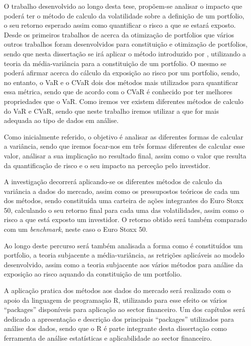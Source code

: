 \documentclass[
  12pt,
  a4paper,
  openany]{book}
\begin{document}
O trabalho desenvolvido ao longo desta tese, propõem-se analisar o impacto que poderá ter o método de calculo da volatilidade sobre a definição de um portfolio, o seu retorno esperado assim como quantificar o risco a que se estará exposto. Desde os primeiros trabalhos de \citet{Markowitz1952} acerca da otimização de portfolios que vários outros trabalhos foram desenvolvidos para constituição e otimização de portfolios, sendo que nesta dissertação se irá aplicar o método introduzido por \citet{Markowitz1952}, utilizando a teoria da média-variância para a constituição de um portfolio. O mesmo se poderá afirmar acerca do cálculo da exposição ao risco por um portfolio, sendo, no entanto, o VaR e o CVaR dois dos métodos mais utilizados para quantificar essa métrica, sendo que de acordo com \citet{OptVaR2000} o CVaR é conhecido por ter melhores propriedades que o VaR. Como iremos ver existem diferentes métodos de calculo do VaR e CVaR, sendo que neste trabalho iremos utilizar a que for mais adequada ao tipo de dados em análise.

Como inicialmente referido, o objetivo é analisar as diferentes formas de calcular a variância, sendo que iremos focar-nos em três formas diferentes de calcular esse valor, análisar a sua implicação no resultado final, assim como o valor que resulta da quantificação de risco e o seu impacto na perceção pelo investidor.

A investigação decorrerá aplicando-se os diferentes métodos de calculo da variância a dados do mercado, assim como os pressupostos teóricos de cada um dos métodos, sendo constituída uma carteira de ações integrantes do Euro Stoxx 50, calculando o seu retorno final para cada uma das volatilidades, assim como o risco a que está exposto um investidor. O retorno obtido será também comparado com um \emph{benchmark}, neste caso o Euro Stoxx 50.

Ao longo deste percurso será também analisada a forma como é constituídos um portfolio, a teoria subjacente a média-variância, as retrições aplicáveis ao modelo desenvolvido, assim como a teoria subjacente aos vários métodos para análise da exposição ao risco aquando da constituição de um portfolio.

A aplicação pratica dos métodos aos dados do mercado será realizado com o apoio da linguagem de programação R, utilizando para esse efeito os vários ``packages'' disponíveis para aplicação ao sector financeiro. Um dos capítulos será dedicado a apresentação e descrição dos principais ``packages'' utilizados para análise dos dados, sendo que o R é parte integrante desta dissertação como ferramenta de análise estatísticas e aplicabilidade ao sector financeiro.
\end{document}
